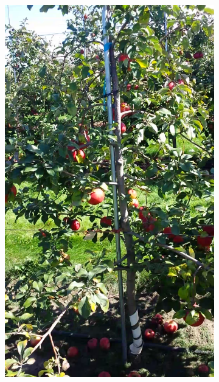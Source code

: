 \begin{figure}[!htbp]
    \centering
    \begin{subfigure}[b]{.25\columnwidth}
        \includegraphics[width =\textwidth]{figures/merge_both/bothsidetreevisible.png}  
        \caption{ \label{fig:Single_Tree}}
    \end{subfigure} \begin{subfigure}[b]{.7127\columnwidth}

\end{subfigure}
\end{figure}
